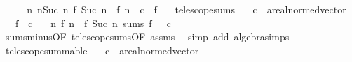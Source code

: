 \begin{isabellebody}
\ \ \isamarkupfalse%
\ \isamarkupfalse%
\ {\isachardoublequoteopen}{\isacharparenleft}{\kern0pt}{\isasymlambda}n{\isachardot}{\kern0pt}\ {\isasymSum}n{\isacharless}{\kern0pt}Suc\ n{\isachardot}{\kern0pt}\ f\ {\isacharparenleft}{\kern0pt}Suc\ n{\isacharparenright}{\kern0pt}\ {\isacharminus}{\kern0pt}\ f\ n{\isacharparenright}{\kern0pt}\ {\isasymlonglonglongrightarrow}\ c\ {\isacharminus}{\kern0pt}\ f\ {}{\isachardoublequoteclose}\ \isacommand{{\isachardot}{\kern0pt}}\isamarkupfalse%
\isanewline
{}\isamarkupfalse%
%
\endisatagproof
{\isafoldproof}%
%
\isadelimproof
\isanewline
%
\endisadelimproof
\isanewline
{}\isamarkupfalse%
\ telescope{\isacharunderscore}{\kern0pt}sums{\isacharprime}{\kern0pt}{\isacharcolon}{\kern0pt}\isanewline
\ \ \ c\ {\isacharcolon}{\kern0pt}{\isacharcolon}{\kern0pt}\ {\isachardoublequoteopen}{\isacharprime}{\kern0pt}a{\isacharcolon}{\kern0pt}{\isacharcolon}{\kern0pt}real{\isacharunderscore}{\kern0pt}normed{\isacharunderscore}{\kern0pt}vector{\isachardoublequoteclose}\isanewline
\ \ \ {\isachardoublequoteopen}f\ {\isasymlonglonglongrightarrow}\ c{\isachardoublequoteclose}\isanewline
\ \ \ {\isachardoublequoteopen}{\isacharparenleft}{\kern0pt}{\isasymlambda}n{\isachardot}{\kern0pt}\ f\ n\ {\isacharminus}{\kern0pt}\ f\ {\isacharparenleft}{\kern0pt}Suc\ n{\isacharparenright}{\kern0pt}{\isacharparenright}{\kern0pt}\ sums\ {\isacharparenleft}{\kern0pt}f\ {}\ {\isacharminus}{\kern0pt}\ c{\isacharparenright}{\kern0pt}{\isachardoublequoteclose}\isanewline
%
\isadelimproof
\ \ %
\endisadelimproof
%
\isatagproof
{}\isamarkupfalse%
\ sums{\isacharunderscore}{\kern0pt}minus{\isacharbrackleft}{\kern0pt}OF\ telescope{\isacharunderscore}{\kern0pt}sums{\isacharbrackleft}{\kern0pt}OF\ assms{\isacharbrackright}{\kern0pt}{\isacharbrackright}{\kern0pt}\ \isamarkupfalse%
\ {\isacharparenleft}{\kern0pt}simp\ add{\isacharcolon}{\kern0pt}\ algebra{\isacharunderscore}{\kern0pt}simps{\isacharparenright}{\kern0pt}%
\endisatagproof
{\isafoldproof}%
%
\isadelimproof
\isanewline
%
\endisadelimproof
\isanewline
{}\isamarkupfalse%
\ telescope{\isacharunderscore}{\kern0pt}summable{\isacharcolon}{\kern0pt}\isanewline
\ \ \ c\ {\isacharcolon}{\kern0pt}{\isacharcolon}{\kern0pt}\ {\isachardoublequoteopen}{\isacharprime}{\kern0pt}a{\isacharcolon}{\kern0pt}{\isacharcolon}{\kern0pt}real{\isacharunderscore}{\kern0pt}normed{\isacharunderscore}{\kern0pt}vector{\isachardoublequoteclose}\isanewline

\end{isabellebody}
